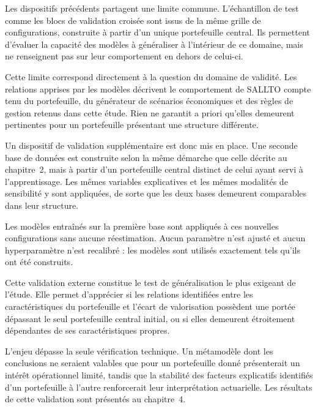 Les dispositifs précédents partagent une limite commune. L'échantillon de test comme les blocs de validation croisée sont issus de la même grille de configurations, construite à partir d'un unique portefeuille central. Ils permettent d'évaluer la capacité des modèles à généraliser à l'intérieur de ce domaine, mais ne renseignent pas sur leur comportement en dehors de celui-ci.

Cette limite correspond directement à la question du domaine de validité. Les relations apprises par les modèles décrivent le comportement de SALLTO compte tenu du portefeuille, du générateur de scénarios économiques et des règles de gestion retenus dans cette étude. Rien ne garantit a priori qu'elles demeurent pertinentes pour un portefeuille présentant une structure différente.

Un dispositif de validation supplémentaire est donc mis en place. Une seconde base de données est construite selon la même démarche que celle décrite au chapitre~2, mais à partir d'un portefeuille central distinct de celui ayant servi à l'apprentissage. Les mêmes variables explicatives et les mêmes modalités de sensibilité y sont appliquées, de sorte que les deux bases demeurent comparables dans leur structure.

Les modèles entraînés sur la première base sont appliqués à ces nouvelles configurations sans aucune réestimation. Aucun paramètre n'est ajusté et aucun hyperparamètre n'est recalibré : les modèles sont utilisés exactement tels qu'ils ont été construits.

Cette validation externe constitue le test de généralisation le plus exigeant de l'étude. Elle permet d'apprécier si les relations identifiées entre les caractéristiques du portefeuille et l'écart de valorisation possèdent une portée dépassant le seul portefeuille central initial, ou si elles demeurent étroitement dépendantes de ses caractéristiques propres.

L'enjeu dépasse la seule vérification technique. Un métamodèle dont les conclusions ne seraient valables que pour un portefeuille donné présenterait un intérêt opérationnel limité, tandis que la stabilité des facteurs explicatifs identifiés d'un portefeuille à l'autre renforcerait leur interprétation actuarielle. Les résultats de cette validation sont présentés au chapitre~4.

